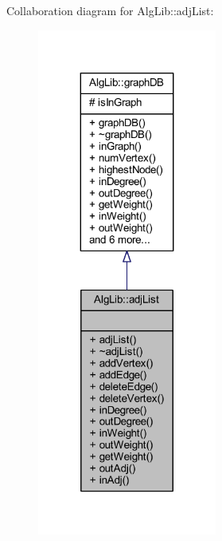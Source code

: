 Collaboration diagram for Alg\+Lib\+:\+:adj\+List\+:\nopagebreak
\begin{figure}[H]
\begin{center}
\leavevmode
\includegraphics[width=167pt]{class_alg_lib_1_1adj_list__coll__graph}
\end{center}
\end{figure}
